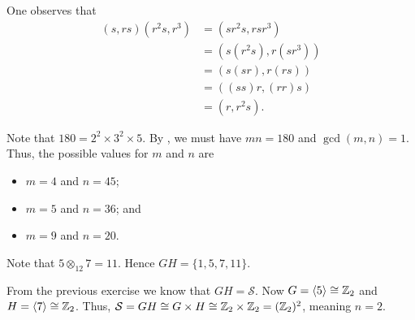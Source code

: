 \begin{questions}
    \item One observes that
    \begin{align*}
        (s, rs)(r^2s, r^3) &= (sr^2s, rsr^3)\\
        &= (s(r^2s), r(sr^3))\\
        &= (s(sr), r(rs))\\
        &= ((ss)r, (rr)s)\\
        &= (r, r^2s).
    \end{align*}

    \item Note that $180 = 2^2 \times 3^2 \times 5$. By , we must have $mn = 180$ and $\gcd(m, n) = 1$. Thus, the possible values for $m$ and $n$ are
    \begin{itemize}
        \item $m = 4$ and $n = 45$;
        \item $m = 5$ and $n = 36$; and
        \item $m = 9$ and $n = 20$.
    \end{itemize}

    \item Note that $5 \otimes_{12} 7 = 11$. Hence $GH = \{1, 5, 7, 11\}$.

    \item From the previous exercise we know that $GH = \mathcal{S}$. Now $G = \langle 5 \rangle \cong \mathbb{Z}_2$ and $H = \langle 7 \rangle \cong \mathbb{Z}_2$. Thus, $\mathcal{S} = GH \cong G \times H \cong \mathbb{Z}_2 \times \mathbb{Z}_2 = (\mathbb{Z}_2)^2$, meaning $n = 2$.
\end{questions}

